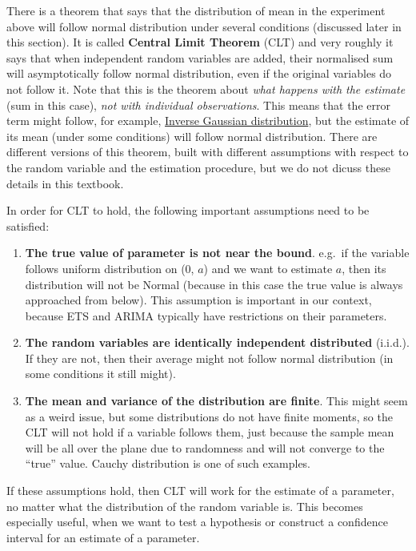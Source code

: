 \documentclass[
]{book}
\providecommand{\tightlist}{%
  \setlength{\itemsep}{0pt}\setlength{\parskip}{0pt}}
\theoremstyle{definition}
\theoremstyle{definition}
\theoremstyle{definition}
\theoremstyle{definition}
\theoremstyle{remark}
\begin{document}
There is a theorem that says that the distribution of mean in the experiment above will follow normal distribution under several conditions (discussed later in this section). It is called \textbf{Central Limit Theorem} (CLT) and very roughly it says that when independent random variables are added, their normalised sum will asymptotically follow normal distribution, even if the original variables do not follow it. Note that this is the theorem about \emph{what happens with the estimate} (sum in this case), \emph{not with individual observations}. This means that the error term might follow, for example, \protect\hyperlink{IGDistribution}{Inverse Gaussian distribution}, but the estimate of its mean (under some conditions) will follow normal distribution. There are different versions of this theorem, built with different assumptions with respect to the random variable and the estimation procedure, but we do not dicuss these details in this textbook.

In order for CLT to hold, the following important assumptions need to be satisfied:

\begin{enumerate}
\def\labelenumi{\arabic{enumi}.}
\tightlist
\item
  \textbf{The true value of parameter is not near the bound}. e.g.~if the variable follows uniform distribution on (0, \(a\)) and we want to estimate \(a\), then its distribution will not be Normal (because in this case the true value is always approached from below). This assumption is important in our context, because ETS and ARIMA typically have restrictions on their parameters.
\item
  \textbf{The random variables are identically independent distributed} (i.i.d.). If they are not, then their average might not follow normal distribution (in some conditions it still might).
\item
  \textbf{The mean and variance of the distribution are finite}. This might seem as a weird issue, but some distributions do not have finite moments, so the CLT will not hold if a variable follows them, just because the sample mean will be all over the plane due to randomness and will not converge to the ``true'' value. Cauchy distribution is one of such examples.
\end{enumerate}

If these assumptions hold, then CLT will work for the estimate of a parameter, no matter what the distribution of the random variable is. This becomes especially useful, when we want to test a hypothesis or construct a confidence interval for an estimate of a parameter.
\end{document}

